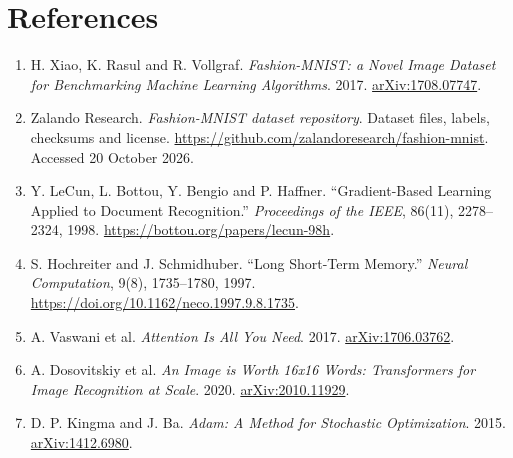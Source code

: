 \section*{References}
\begin{enumerate}

\item
H. Xiao, K. Rasul and R. Vollgraf.
\emph{Fashion-MNIST: a Novel Image Dataset for Benchmarking Machine Learning Algorithms}.
2017. \href{https://arxiv.org/abs/1708.07747}{arXiv:1708.07747}.
\item
Zalando Research. \emph{Fashion-MNIST dataset repository}.
Dataset files, labels, checksums and license.
\url{https://github.com/zalandoresearch/fashion-mnist}.
Accessed 20 October 2026.
\item
Y. LeCun, L. Bottou, Y. Bengio and P. Haffner.
``Gradient-Based Learning Applied to Document Recognition.''
\emph{Proceedings of the IEEE}, 86(11), 2278--2324, 1998.
\url{https://bottou.org/papers/lecun-98h}.
\item
S. Hochreiter and J. Schmidhuber.
``Long Short-Term Memory.''
\emph{Neural Computation}, 9(8), 1735--1780, 1997.
\url{https://doi.org/10.1162/neco.1997.9.8.1735}.
\item
A. Vaswani et al. \emph{Attention Is All You Need}.
2017. \href{https://arxiv.org/abs/1706.03762}{arXiv:1706.03762}.
\item
A. Dosovitskiy et al.
\emph{An Image is Worth 16x16 Words: Transformers for Image Recognition at Scale}.
2020. \href{https://arxiv.org/abs/2010.11929}{arXiv:2010.11929}.
\item
D. P. Kingma and J. Ba.
\emph{Adam: A Method for Stochastic Optimization}.
2015. \href{https://arxiv.org/abs/1412.6980}{arXiv:1412.6980}.
\end{enumerate}



